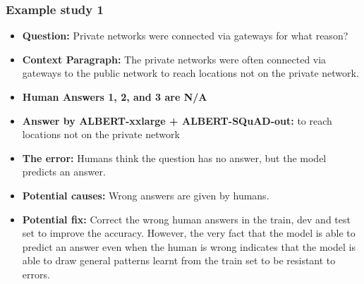 \documentclass{article}
\begin{document}
\subsubsection{Example study 1}
\begin{itemize}
    \item \textbf{Question:} Private networks were connected via gateways for what reason? 
    \item \textbf{Context Paragraph:} The private networks were often connected via gateways to the public network to reach locations not on the private network.
    \item \textbf{Human Answers 1, 2, and 3 are N/A} 
    \item \textbf{Answer by ALBERT-xxlarge + ALBERT-SQuAD-out:} to reach locations not on the private network
\item \textbf{The error:} Humans think the question has no answer, but the model predicts an answer.
    \item \textbf{Potential causes:} Wrong answers are given by humans.
    \item \textbf{Potential fix:} Correct the wrong human answers in the train, dev and test set to improve the accuracy. However, the very fact that the model is able to predict an answer even when the human is wrong indicates that the model is able to draw general patterns learnt from the train set to be resistant to errors.
\end{itemize}
\end{document}
